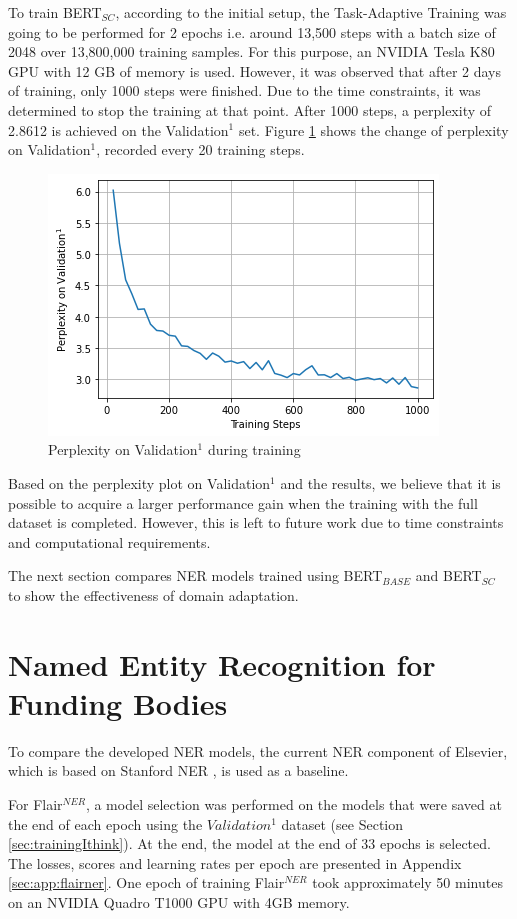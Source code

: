 \documentclass{report}
\theoremstyle{definition}
\theoremstyle{remark}
\begin{document}
To train BERT$_{SC}$, according to the initial setup, the Task-Adaptive Training was going to be performed for 2 epochs i.e. around 13,500 steps with a batch size of 2048 over 13,800,000 training samples. For this purpose, an NVIDIA Tesla K80 GPU with 12 GB of memory is used. However, it was observed that after 2 days of training, only 1000 steps were finished. Due to the time constraints, it was determined to stop the training at that point. After 1000 steps, a perplexity of 2.8612 is achieved on the Validation$^1$ set. Figure \ref{fig:perp} shows the change of perplexity on Validation$^1$, recorded every 20 training steps.

\begin{figure}[h!]
    \centering
    \includegraphics[scale=0.7]{perpplot.png}
    \caption{Perplexity on Validation$^1$ during training}
    \label{fig:perp}
\end{figure}

Based on the perplexity plot on Validation$^1$ and the results, we believe that it is possible to acquire a larger performance gain when the training with the full dataset is completed. However, this is left to future work due to time constraints and computational requirements. 

The next section compares NER models trained using BERT$_{BASE}$ and BERT$_{SC}$ to show the effectiveness of domain adaptation.

\section{Named Entity Recognition for Funding Bodies}
To compare the developed NER models, the current NER component of Elsevier, which is based on Stanford NER \cite{stanfordNER},  is used as a baseline.

For Flair$^{NER}$, a model selection was performed on the models that were saved at the end of each epoch using the $Validation^1$ dataset (see Section \ref{sec:trainingIthink}). At the end, the model at the end of 33 epochs is selected. The losses, scores and learning rates per epoch are presented in Appendix \ref{sec:app:flairner}. One epoch of training Flair$^{NER}$ took approximately 50 minutes on an NVIDIA Quadro T1000 GPU with 4GB memory. 
\end{document}
